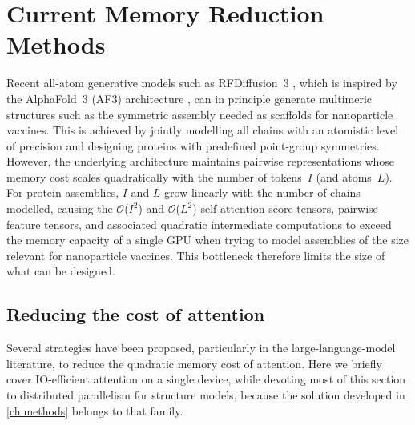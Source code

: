 \chapter{Current Memory Reduction Methods}
\label{ch:current-memory-reduction-methods}

Recent all-atom generative models such as RFDiffusion~3
\parencite[RFD3;][]{butcher_novo_2025}, which is inspired by the AlphaFold~3
(AF3) architecture \parencite{abramsonAccurateStructurePrediction2024},
can in principle generate multimeric structures such as the symmetric assembly needed as scaffolds
for nanoparticle vaccines. This is achieved by jointly modelling all chains with
an atomistic level of precision and designing proteins with predefined point-group 
symmetries. However, the underlying architecture maintains pairwise representations 
whose memory cost scales quadratically with the number of tokens~$I$ (and atoms~$L$). 
For protein assemblies, $I$ and $L$ grow linearly with the number of chains
modelled, causing the $\mathcal{O}$($I^{2}$) and $\mathcal{O}$($L^{2}$) self-attention score tensors, pairwise 
feature tensors, and associated quadratic intermediate computations to exceed the memory capacity 
of a single GPU when trying to model assemblies of the size relevant for nanoparticle vaccines. 
This bottleneck therefore limits the size of what can be designed.


\section{Reducing the cost of attention}
\label{sec:reducing-attention-cost}

Several strategies have been proposed, particularly in the large-language-model
literature, to reduce the quadratic memory cost of attention. Here we briefly cover 
IO-efficient attention on a single device, while devoting most of this section to distributed 
parallelism for structure models, because the solution developed in
\cref{ch:methods} belongs to that family. 

